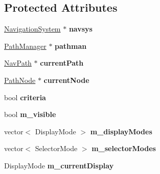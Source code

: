 \subsection*{Protected Attributes}
\begin{DoxyCompactItemize}
\item 
\hyperlink{classNavigationSystem}{Navigation\+System} $\ast$ {\bfseries navsys}\hypertarget{classNavComputer_a6c46ba6b7ddc47a36c3ecacaada60a0f}{}\label{classNavComputer_a6c46ba6b7ddc47a36c3ecacaada60a0f}

\item 
\hyperlink{classPathManager}{Path\+Manager} $\ast$ {\bfseries pathman}\hypertarget{classNavComputer_ac101d4007a746985f898f36352f5839b}{}\label{classNavComputer_ac101d4007a746985f898f36352f5839b}

\item 
\hyperlink{classNavPath}{Nav\+Path} $\ast$ {\bfseries current\+Path}\hypertarget{classNavComputer_ab7fa47da321c5218a2b6915f70bdd103}{}\label{classNavComputer_ab7fa47da321c5218a2b6915f70bdd103}

\item 
\hyperlink{classPathNode}{Path\+Node} $\ast$ {\bfseries current\+Node}\hypertarget{classNavComputer_a104ba3e9fdd6af417da5de5d33a50632}{}\label{classNavComputer_a104ba3e9fdd6af417da5de5d33a50632}

\item 
bool {\bfseries criteria}\hypertarget{classNavComputer_a403eea1ff25d9d5e976d956a6b578350}{}\label{classNavComputer_a403eea1ff25d9d5e976d956a6b578350}

\item 
bool {\bfseries m\+\_\+visible}\hypertarget{classNavComputer_a6f9c1216073e0c200c453688e44581e5}{}\label{classNavComputer_a6f9c1216073e0c200c453688e44581e5}

\item 
vector$<$ Display\+Mode $>$ {\bfseries m\+\_\+display\+Modes}\hypertarget{classNavComputer_a06ab33513307af09a510a768d449d2cc}{}\label{classNavComputer_a06ab33513307af09a510a768d449d2cc}

\item 
vector$<$ Selector\+Mode $>$ {\bfseries m\+\_\+selector\+Modes}\hypertarget{classNavComputer_a43262d6052cb11d8e18f10e16e40f40c}{}\label{classNavComputer_a43262d6052cb11d8e18f10e16e40f40c}

\item 
Display\+Mode {\bfseries m\+\_\+current\+Display}\hypertarget{classNavComputer_a8554e076f1468ab1588998fd07f3afe1}{}\label{classNavComputer_a8554e076f1468ab1588998fd07f3afe1}


\end{DoxyCompactItemize}
